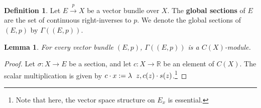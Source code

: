 \documentclass[11pt]{article}
\newcommand{\R}{\mathbb{R}}
\theoremstyle{plain}
\newtheorem{lemma}{Lemma}[section]
\theoremstyle{definition}
\newtheorem{definition}{Definition}[section]
\begin{document}
\begin{definition}\label{def:global-sections}
  Let \(E \overset{p}{\to} X\) be a vector bundle over \(X\). The \textbf{global sections} of \(E\) are the set of continuous right-inverses to \(p\). We denote the global sections of \((E,p)\) by \(\Gamma((E,p))\).
\end{definition}

\begin{lemma}\label{lemma:global-sections-module}
  For every vector bundle \((E,p)\), \(\Gamma((E,p))\) is a \(C(X)\)-module.
\end{lemma}
\begin{proof}
  Let \(\sigma : X \to E\) be a section, and let \(c : X \to \R\) be an element of \(C(X)\). The scalar multiplication is given by \(c \cdot x := \lambda \hspace{2mm} z, c(z) \cdot s(z)\).\footnote{Note that here, the vector space structure on \(E_x\) is essential.}
\end{proof}
\end{document}
